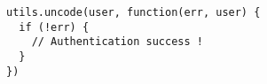 
\lstset{language=C}

\begin{lstlisting}[frame=single]
utils.uncode(user, function(err, user) {
  if (!err) {
    // Authentication success !
  }
})
\end{lstlisting}